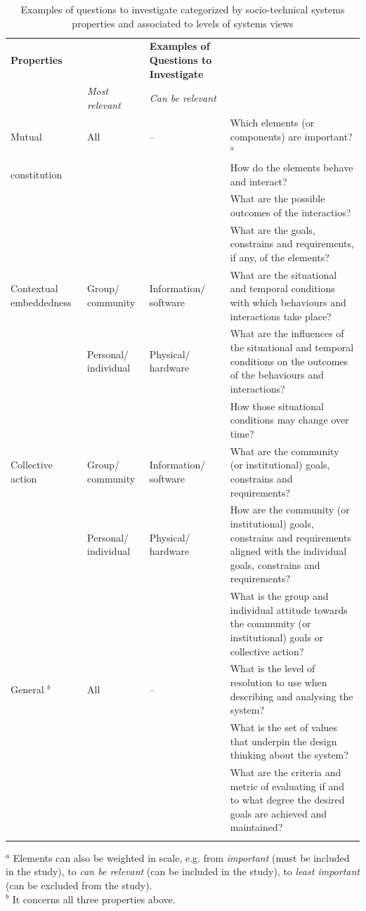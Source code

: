 \begin{table}
\caption{Examples of questions to investigate categorized by socio-technical systems properties and associated to levels of systems views }
\label{tab:questions}       %
%
%
\begin{tabular}{>{\raggedright}p{2cm}>{\raggedright}p{1.6cm}>{\raggedright}p{1.7cm}p{6.2cm}}
\hline\noalign{\smallskip}
\textbf{Properties}  & \multicolumn{2}{l}{\textbf{Relevant Levels of Views}} &   \textbf{Examples of Questions to Investigate} \\
  &   \textit{Most relevant} & \textit{Can be relevant} &  \\
\noalign{\smallskip}\svhline\noalign{\smallskip}
Mutual & All & -- & Which elements (or components) are important? $^a$  \\
constitution &   &  & How do the elements behave and interact?\\
  &   &  & What are the possible outcomes of the interactios?\\
  &   &  & What are the goals, constrains and requirements, if any, of the elements?\\ \hline\noalign{\smallskip}
Contextual embeddedness &   Group/ community &  Information/ software & What are the situational and temporal conditions with which behaviours and interactions take place? \\
 &   Personal/ individual &  Physical/ hardware & What are the influences of  the situational and temporal conditions on the outcomes of the behaviours and interactions?\\
 &     &    & How those situational conditions may change over time?\\ \hline\noalign{\smallskip}
Collective action   & Group/ community  &  Information/ software & What are the community (or institutional) goals, constrains and requirements?\\
   &  Personal/ individual  & Physical/ hardware & How are the community (or institutional) goals, constrains and requirements aligned with the individual goals, constrains and requirements? \\
   &&& What is the group and individual attitude towards the community (or institutional) goals or collective action? \\ \hline\noalign{\smallskip}
General $^b$ & All  &  --  & What is the level of resolution to use when describing and analysing the system? \\
&&& What is the set of values that underpin the design thinking about the system? \\
&&& What are the criteria and metric of evaluating if and to what degree the desired goals are achieved and maintained? \\
\noalign{\smallskip}\hline\noalign{\smallskip}
\end{tabular}
$^a$ Elements can also be weighted in scale, e.g. from \textit{important} (must be included in the study), to \textit{can be relevant} (can be included in the study), to \textit{least important} (can be excluded from the study).\\
$^b$ It concerns all three properties above. 
\end{table}
